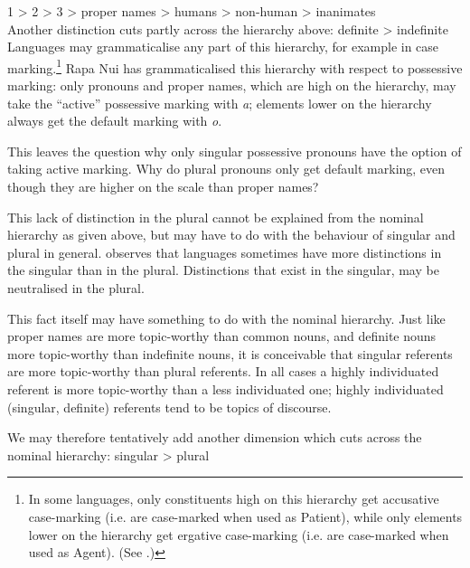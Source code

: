 \ea\label{ex:6.115a}
1{\rmfnm} {\textgreater} 2 {\textgreater} 3 {\textgreater} proper names {\textgreater} humans {\textgreater} non\nobreakdash-human {\textgreater} inanimates \\
\z
{}
Another distinction cuts partly across the hierarchy above:
\ea\label{ex:6.115b}
  definite {\textgreater} indefinite
\z
Languages may grammaticalise any part of this hierarchy, for example in case marking.\footnote{\label{fn:307}In some languages, only constituents high on this hierarchy get accusative case-marking (i.e. are case-marked when used as Patient), while only elements lower on the hierarchy get ergative case-marking (i.e. are case-marked when used as Agent). (See \citealt{Dixon1994}.)} Rapa Nui has grammaticalised this hierarchy with respect to possessive marking: only pronouns and proper names, which are high on the hierarchy, may take the “active” possessive marking with \textit{{\ꞌ}a}; elements lower on the hierarchy always get the default marking with \textit{o}.

This leaves the question why only singular possessive pronouns have the option of taking active marking. Why do plural pronouns only get default marking, even though they are higher on the scale than proper names? 

This lack of distinction in the plural cannot be explained from the nominal hierarchy as given above, but may have to do with the behaviour of singular and plural in general. \citet{Dixon1994} observes that languages sometimes have more distinctions in the singular than in the plural. Distinctions that exist in the singular, may be neutralised in the plural. 

This fact itself may have something to do with the nominal hierarchy. Just like proper names are more topic-worthy than common nouns, and definite nouns more topic-wor\-thy than indefinite nouns, it is conceivable that singular referents are more topic-worthy than plural referents. In all cases a highly individuated referent is more topic-worthy than a less individuated one; highly individuated (singular, definite) referents tend to be topics of discourse.

We may therefore tentatively add another dimension which cuts across the nominal hierarchy: 
\ea\label{ex:6.115c}
singular {\textgreater} plural
\z

